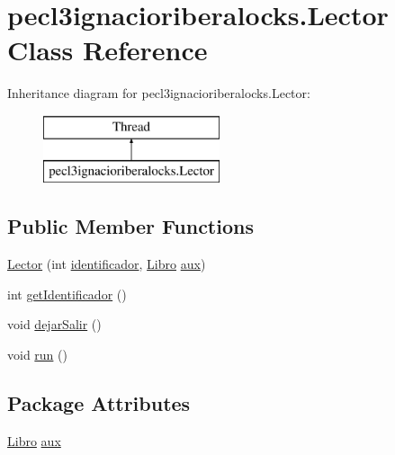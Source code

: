 \hypertarget{classpecl3ignacioriberalocks_1_1_lector}{}\section{pecl3ignacioriberalocks.\+Lector Class Reference}
\label{classpecl3ignacioriberalocks_1_1_lector}
Inheritance diagram for pecl3ignacioriberalocks.\+Lector\+:\begin{figure}[H]
\begin{center}
\leavevmode
\includegraphics[height=2.000000cm]{classpecl3ignacioriberalocks_1_1_lector}
\end{center}
\end{figure}
\subsection*{Public Member Functions}
\begin{DoxyCompactItemize}
\item 
\mbox{\hyperlink{classpecl3ignacioriberalocks_1_1_lector_aed6f8b898f2a4cc1b7b4fb96a4b1c1e4}{Lector}} (int \mbox{\hyperlink{classpecl3ignacioriberalocks_1_1_lector_a1bbc40775f724c5f1b591b67f5902c72}{identificador}}, \mbox{\hyperlink{classpecl3ignacioriberalocks_1_1_libro}{Libro}} \mbox{\hyperlink{classpecl3ignacioriberalocks_1_1_lector_a9efbbc039743d8128a3c90cc82743a3b}{aux}})
\item 
int \mbox{\hyperlink{classpecl3ignacioriberalocks_1_1_lector_a411c2737b4407ba0cd603339649975af}{get\+Identificador}} ()
\item 
void \mbox{\hyperlink{classpecl3ignacioriberalocks_1_1_lector_a69fb676c676ca482f950fc40934cb774}{dejar\+Salir}} ()
\item 
void \mbox{\hyperlink{classpecl3ignacioriberalocks_1_1_lector_a70510480ab1f667be3d17f4e5c959158}{run}} ()
\end{DoxyCompactItemize}
\subsection*{Package Attributes}
\begin{DoxyCompactItemize}
\item 
\mbox{\hyperlink{classpecl3ignacioriberalocks_1_1_libro}{Libro}} \mbox{\hyperlink{classpecl3ignacioriberalocks_1_1_lector_a9efbbc039743d8128a3c90cc82743a3b}{aux}}
\end{DoxyCompactItemize}

